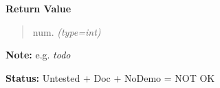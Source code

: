 \begin{boxedminipage}{\funcwidth}
\begin{quote}
      \end{quote}

      \textbf{Return Value}
    \vspace{-1ex}

      \begin{quote}

num.
      {\it (type=int)}

      \end{quote}

\textbf{Note:} 
e.g. \emph{todo}


\textbf{Status:} 
Untested + Doc + NoDemo = NOT OK


    \end{boxedminipage}

    \label{xformslib:flflimage:flimage_warp}

    \vspace{0.5ex}

